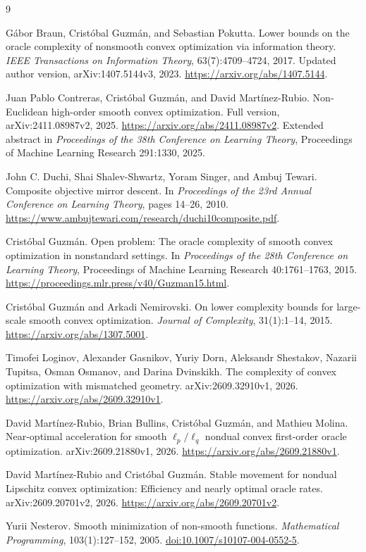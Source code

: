 \documentclass[11pt,a4paper]{article}
\theoremstyle{definition}
\theoremstyle{remark}
\begin{document}
\begin{thebibliography}{9}
\small
\setlength{\itemsep}{4pt}

G\'abor Braun, Crist\'obal Guzm\'an, and Sebastian Pokutta.
Lower bounds on the oracle complexity of nonsmooth convex optimization via
information theory.
\emph{IEEE Transactions on Information Theory}, 63(7):4709--4724, 2017.
Updated author version, arXiv:1407.5144v3, 2023.
\url{https://arxiv.org/abs/1407.5144}.

Juan Pablo Contreras, Crist\'obal Guzm\'an, and David Mart\'inez-Rubio.
Non-Euclidean high-order smooth convex optimization.
Full version, arXiv:2411.08987v2, 2025.
\url{https://arxiv.org/abs/2411.08987v2}.
Extended abstract in \emph{Proceedings of the 38th Conference on Learning
Theory}, Proceedings of Machine Learning Research 291:1330, 2025.

John C. Duchi, Shai Shalev-Shwartz, Yoram Singer, and Ambuj Tewari.
Composite objective mirror descent.
In \emph{Proceedings of the 23rd Annual Conference on Learning Theory},
pages 14--26, 2010.
\url{https://www.ambujtewari.com/research/duchi10composite.pdf}.

Crist\'obal Guzm\'an.
Open problem: The oracle complexity of smooth convex optimization in
nonstandard settings.
In \emph{Proceedings of the 28th Conference on Learning Theory},
Proceedings of Machine Learning Research 40:1761--1763, 2015.
\url{https://proceedings.mlr.press/v40/Guzman15.html}.

Crist\'obal Guzm\'an and Arkadi Nemirovski.
On lower complexity bounds for large-scale smooth convex optimization.
\emph{Journal of Complexity}, 31(1):1--14, 2015.
\url{https://arxiv.org/abs/1307.5001}.

Timofei Loginov, Alexander Gasnikov, Yuriy Dorn, Aleksandr Shestakov,
Nazarii Tupitsa, Osman Osmanov, and Darina Dvinskikh.
The complexity of convex optimization with mismatched geometry.
arXiv:2609.32910v1, 2026.
\url{https://arxiv.org/abs/2609.32910v1}.

David Mart\'inez-Rubio, Brian Bullins, Crist\'obal Guzm\'an, and Mathieu Molina.
Near-optimal acceleration for smooth $\ell_p/\ell_q$ nondual convex
first-order oracle optimization.
arXiv:2609.21880v1, 2026.
\url{https://arxiv.org/abs/2609.21880v1}.

David Mart\'inez-Rubio and Crist\'obal Guzm\'an.
Stable movement for nondual Lipschitz convex optimization: Efficiency and
nearly optimal oracle rates.
arXiv:2609.20701v2, 2026.
\url{https://arxiv.org/abs/2609.20701v2}.

Yurii Nesterov.
Smooth minimization of non-smooth functions.
\emph{Mathematical Programming}, 103(1):127--152, 2005.
\href{https://doi.org/10.1007/s10107-004-0552-5}{doi:10.1007/s10107-004-0552-5}.

\end{thebibliography}
\end{document}
